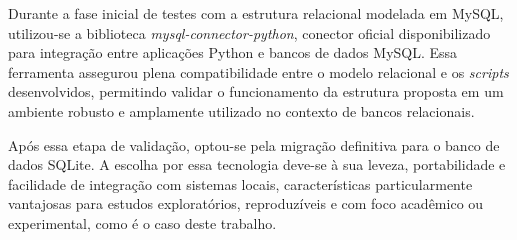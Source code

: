 %

Durante a fase inicial de testes com a estrutura relacional modelada em MySQL, utilizou-se a biblioteca \textit{mysql-connector-python}, conector oficial disponibilizado para integração entre aplicações Python e bancos de dados MySQL. Essa ferramenta assegurou plena compatibilidade entre o modelo relacional e os \textit{scripts} desenvolvidos, permitindo validar o funcionamento da estrutura proposta em um ambiente robusto e amplamente utilizado no contexto de bancos relacionais.

Após essa etapa de validação, optou-se pela migração definitiva para o banco de dados SQLite. A escolha por essa tecnologia deve-se à sua leveza, portabilidade e facilidade de integração com sistemas locais, características particularmente vantajosas para estudos exploratórios, reproduzíveis e com foco acadêmico ou experimental, como é o caso deste trabalho.